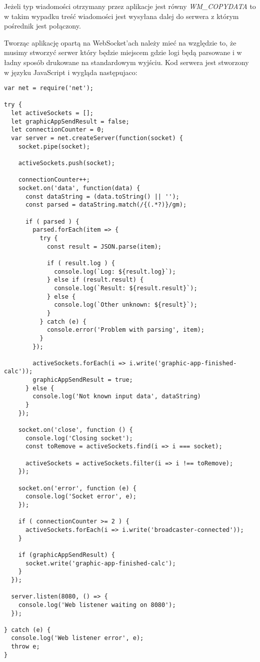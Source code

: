 Jeżeli typ wiadomości otrzymany przez aplikacje jest równy \textit{WM\_COPYDATA} to w takim wypadku treść wiadomości jest wysyłana dalej do serwera z którym pośrednik jest połączony.
\par
Tworząc aplikację opartą na WebSocket'ach należy mieć na względzie to, że musimy stworzyć serwer który będzie miejscem gdzie logi będą parsowane i w ładny sposób drukowane na standardowym wyjściu. Kod serwera jest stworzony w języku JavaScript i wygląda następujaco:
\begin{lstlisting}[caption={Kod aplikacji serwera który wyświetla logi z aplikacji graficznej}]
var net = require('net');

try {
  let activeSockets = [];
  let graphicAppSendResult = false;
  let connectionCounter = 0;
  var server = net.createServer(function(socket) {
    socket.pipe(socket);

    activeSockets.push(socket);

    connectionCounter++;
    socket.on('data', function(data) {
      const dataString = (data.toString() || '');
      const parsed = dataString.match(/{(.*?)}/gm);

      if ( parsed ) {
        parsed.forEach(item => {
          try {
            const result = JSON.parse(item);

            if ( result.log ) {
              console.log(`Log: ${result.log}`);
            } else if (result.result) {
              console.log(`Result: ${result.result}`);
            } else {
              console.log(`Other unknown: ${result}`);
            }
          } catch (e) {
            console.error('Problem with parsing', item);
          }
        });

        activeSockets.forEach(i => i.write('graphic-app-finished-calc'));
        graphicAppSendResult = true;
      } else {
        console.log('Not known input data', dataString)
      }
    });

    socket.on('close', function () {
      console.log('Closing socket');
      const toRemove = activeSockets.find(i => i === socket);

      activeSockets = activeSockets.filter(i => i !== toRemove);
    });

    socket.on('error', function (e) {
      console.log('Socket error', e);
    });

    if ( connectionCounter >= 2 ) {
      activeSockets.forEach(i => i.write('broadcaster-connected'));
    }

    if (graphicAppSendResult) {
      socket.write('graphic-app-finished-calc');
    }
  });

  server.listen(8080, () => {
    console.log('Web listener waiting on 8080');
  });

} catch (e) {
  console.log('Web listener error', e);
  throw e;
}
\end{lstlisting}
